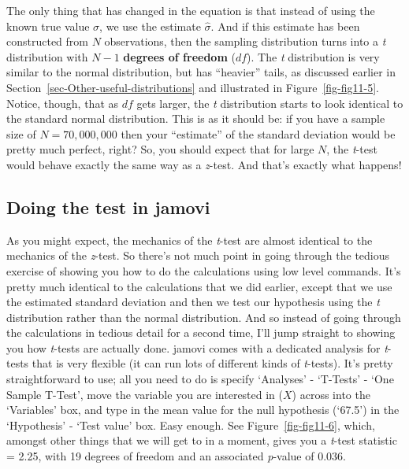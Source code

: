 \documentclass[
  a4paper,
]{book}
\begin{document}
The only thing that has changed in the equation is that instead of using
the known true value \(\sigma\), we use the estimate \(\hat{\sigma}\).
And if this estimate has been constructed from \(N\) observations, then
the sampling distribution turns into a \emph{t} distribution with
\(N-1\) \textbf{degrees of freedom} (\(df\)). The \emph{t} distribution
is very similar to the normal distribution, but has ``heavier'' tails,
as discussed earlier in Section~\ref{sec-Other-useful-distributions} and
illustrated in Figure~\ref{fig-fig11-5}. Notice, though, that as \(df\)
gets larger, the \emph{t} distribution starts to look identical to the
standard normal distribution. This is as it should be: if you have a
sample size of \(N = 70,000,000\) then your ``estimate'' of the standard
deviation would be pretty much perfect, right? So, you should expect
that for large \(N\), the \emph{t}-test would behave exactly the same
way as a \emph{z}-test. And that's exactly what happens!

\hypertarget{doing-the-test-in-jamovi-2}{%
\subsection{Doing the test in jamovi}\label{doing-the-test-in-jamovi-2}}

As you might expect, the mechanics of the \emph{t}-test are almost
identical to the mechanics of the \emph{z}-test. So there's not much
point in going through the tedious exercise of showing you how to do the
calculations using low level commands. It's pretty much identical to the
calculations that we did earlier, except that we use the estimated
standard deviation and then we test our hypothesis using the \emph{t}
distribution rather than the normal distribution. And so instead of
going through the calculations in tedious detail for a second time, I'll
jump straight to showing you how \emph{t}-tests are actually done.
jamovi comes with a dedicated analysis for \emph{t}-tests that is very
flexible (it can run lots of different kinds of \emph{t}-tests). It's
pretty straightforward to use; all you need to do is specify `Analyses'
- `T-Tests' - `One Sample T-Test', move the variable you are interested
in (\(X\)) across into the `Variables' box, and type in the mean value
for the null hypothesis (`67.5') in the `Hypothesis' - `Test value' box.
Easy enough. See Figure~\ref{fig-fig11-6}, which, amongst other things
that we will get to in a moment, gives you a \emph{t}-test statistic =
2.25, with 19 degrees of freedom and an associated \emph{p}-value of
\(0.036\).
\end{document}
